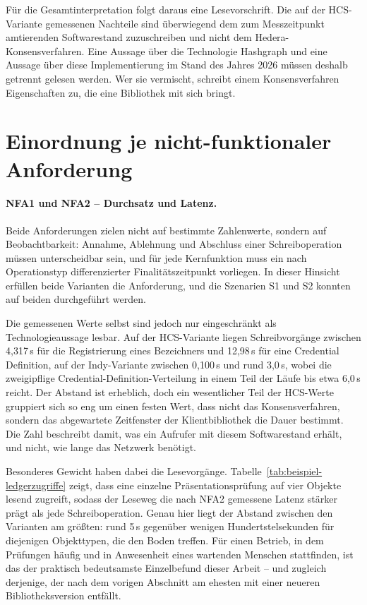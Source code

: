Für die Gesamtinterpretation folgt daraus eine Lesevorschrift. Die auf der HCS-Variante gemessenen Nachteile sind überwiegend dem zum Messzeitpunkt amtierenden Softwarestand zuzuschreiben und nicht dem Hedera-Konsensverfahren. Eine Aussage über die Technologie Hashgraph und eine Aussage über diese Implementierung im Stand des Jahres 2026 müssen deshalb getrennt gelesen werden. Wer sie vermischt, schreibt einem Konsensverfahren Eigenschaften zu, die eine Bibliothek mit sich bringt.

\section{Einordnung je nicht-funktionaler Anforderung}
\label{sec:discussion-nfa}

\paragraph{NFA1 und NFA2 -- Durchsatz und Latenz.} Beide Anforderungen zielen nicht auf bestimmte Zahlenwerte, sondern auf Beobachtbarkeit: Annahme, Ablehnung und Abschluss einer Schreiboperation müssen unterscheidbar sein, und für jede Kernfunktion muss ein nach Operationstyp differenzierter Finalitätszeitpunkt vorliegen. In dieser Hinsicht erfüllen beide Varianten die Anforderung, und die Szenarien S1 und S2 konnten auf beiden durchgeführt werden.

Die gemessenen Werte selbst sind jedoch nur eingeschränkt als Technologieaussage lesbar. Auf der HCS-Variante liegen Schreibvorgänge zwischen 4,317\,s für die Registrierung eines Bezeichners und 12,98\,s für eine Credential Definition, auf der Indy-Variante zwischen 0,100\,s und rund 3,0\,s, wobei die zweigipflige Credential-Definition-Verteilung in einem Teil der Läufe bis etwa 6,0\,s reicht. Der Abstand ist erheblich, doch ein wesentlicher Teil der HCS-Werte gruppiert sich so eng um einen festen Wert, dass nicht das Konsensverfahren, sondern das abgewartete Zeitfenster der Klientbibliothek die Dauer bestimmt. Die Zahl beschreibt damit, was ein Aufrufer mit diesem Softwarestand erhält, und nicht, wie lange das Netzwerk benötigt.

Besonderes Gewicht haben dabei die Lesevorgänge. Tabelle~\ref{tab:beispiel-ledgerzugriffe} zeigt, dass eine einzelne Präsentationsprüfung auf vier Objekte lesend zugreift, sodass der Leseweg die nach NFA2 gemessene Latenz stärker prägt als jede Schreiboperation. Genau hier liegt der Abstand zwischen den Varianten am größten: rund 5\,s gegenüber wenigen Hundertstelsekunden für diejenigen Objekttypen, die den Boden treffen. Für einen Betrieb, in dem Prüfungen häufig und in Anwesenheit eines wartenden Menschen stattfinden, ist das der praktisch bedeutsamste Einzelbefund dieser Arbeit -- und zugleich derjenige, der nach dem vorigen Abschnitt am ehesten mit einer neueren Bibliotheksversion entfällt.

